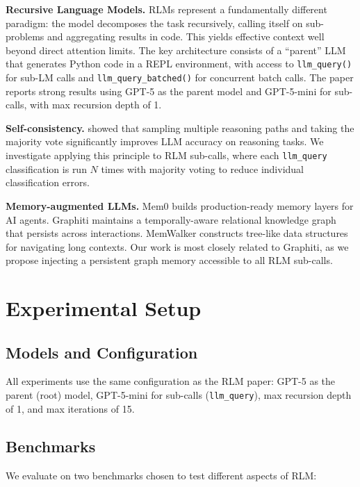 \documentclass[11pt]{article}
\begin{document}
\textbf{Recursive Language Models.} RLMs \citep{zhang2026rlm} represent a fundamentally different paradigm: the model decomposes the task recursively, calling itself on sub-problems and aggregating results in code. This yields effective context well beyond direct attention limits. The key architecture consists of a ``parent'' LLM that generates Python code in a REPL environment, with access to \texttt{llm\_query()} for sub-LM calls and \texttt{llm\_query\_batched()} for concurrent batch calls. The paper reports strong results using GPT-5 as the parent model and GPT-5-mini for sub-calls, with max recursion depth of 1.

\textbf{Self-consistency.} \citet{wang2023selfconsistency} showed that sampling multiple reasoning paths and taking the majority vote significantly improves LLM accuracy on reasoning tasks. We investigate applying this principle to RLM sub-calls, where each \texttt{llm\_query} classification is run $N$ times with majority voting to reduce individual classification errors.

\textbf{Memory-augmented LLMs.} Mem0 \citep{chhikara2025mem0} builds production-ready memory layers for AI agents. Graphiti \citep{ranade2025graphiti} maintains a temporally-aware relational knowledge graph that persists across interactions. MemWalker \citep{chen2023memwalker} constructs tree-like data structures for navigating long contexts. Our work is most closely related to Graphiti, as we propose injecting a persistent graph memory accessible to all RLM sub-calls.

\section{Experimental Setup}

\subsection{Models and Configuration}

All experiments use the same configuration as the RLM paper: GPT-5 as the parent (root) model, GPT-5-mini for sub-calls (\texttt{llm\_query}), max recursion depth of 1, and max iterations of 15.

\subsection{Benchmarks}

We evaluate on two benchmarks chosen to test different aspects of RLM:
\end{document}

